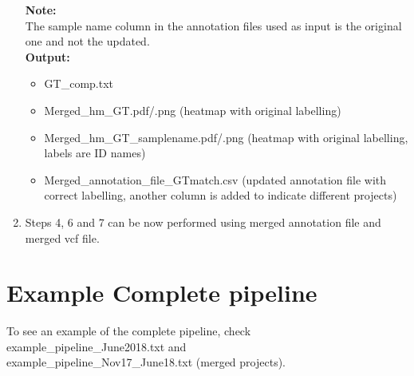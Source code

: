 \documentclass[11pt]{paper}
\begin{document}
\begin{enumerate}
\begin{itemize}
\end{itemize}
\textbf{Note:}\\
The sample name column in the annotation files used as input is the original one and not the updated.\\
\textbf{Output:}
\begin{itemize}
\item GT\_comp.txt
\item Merged\_hm\_GT.pdf/.png (heatmap with original labelling)
\item Merged\_hm\_GT\_samplename.pdf/.png (heatmap with original labelling, labels are ID names)
\item Merged\_annotation\_file\_GTmatch.csv (updated annotation file with correct labelling, another column is added to indicate different projects)
\end{itemize}
\item Steps 4, 6 and 7 can be now performed using merged annotation file and merged vcf file.
\end{enumerate}

\section{Example Complete pipeline}
To see an example of the complete pipeline, check example\_pipeline\_June2018.txt and\\ 
example\_pipeline\_Nov17\_June18.txt (merged projects).
\end{document}
